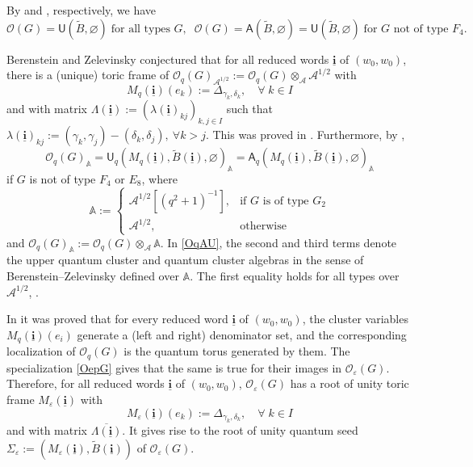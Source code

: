 \documentclass[11pt]{amsart}
\theoremstyle{plain}
\def \cA {\mathcal{A}}
\def \cAt {{\mathcal{A}}^{1/2}}
\def \A {{\boldsymbol{\mathsf A}}}
\def \U {{\boldsymbol{\mathsf U}}}
\def \B  {{\widetilde{B}}}
\def \OO {{\mathcal{O}}}
\def \ep {\varepsilon}
\def \ol {\overline}
\newcommand{\ubi}{\underline{\mathbf{i}}}
\begin{document}
By \cite[Theorem B.1]{QY} and \cite[Theorem 3.1]{O}, respectively, we have 
\begin{equation}
\label{OG}
\OO(G) = \U(\B, \varnothing) \; \mbox{for all types $G$}, \; \;    
\OO(G) = \A(\B, \varnothing) = \U(\B, \varnothing)  \; \mbox{for $G$ not of type $F_4$}.
\end{equation} 

Berenstein and Zelevinsky \cite{BerZe} conjectured that for all reduced words $\ubi$ of $(w_0, w_0)$, there is a (unique) toric frame of $\OO_q(G)_{\cAt} := \OO_q(G) \otimes_{\cA} \cAt$ 
with
\[
M_q(\ubi)(e_k):= \Delta_{\gamma_k, \delta_k}, \quad \forall \; k \in I 
\]
and with matrix $\Lambda(\ubi):= (\lambda(\ubi)_{kj})_{k,j \in I}$ such that $\lambda(\ubi)_{kj}:=(\gamma_k,\gamma_j)-(\delta_k,\delta_j),\ \forall k>j$. 
This was proved in \cite{GY1,QY}. Furthermore, by \cite[Theorem A]{OQY26}, 
\begin{equation}
\label{OqAU}
\OO_q(G)_{\mathbb{A}} = \U_q(M_q(\ubi), \B(\ubi), \varnothing)_{\mathbb{A}} =  \A_q(M_q(\ubi), \B(\ubi), \varnothing)_{\mathbb{A}}
\end{equation}
if $G$ is not of type $F_4$ or $E_8$, where  
\[
{\mathbb{A}} := 
\begin{cases}
\cAt[(q^2 +1)^{-1}], &\mbox{if $G$ is of type $G_2$}
\\
\cAt, & \mbox{otherwise}
\end{cases}
\]
and  $\OO_q(G)_{\mathbb{A}} := \OO_q(G) \otimes_{\cA} {\mathbb{A}}$. 
In \eqref{OqAU}, the second and third terms denote the upper quantum cluster and quantum cluster algebras in the sense of Berenstein--Zelevinsky 
\cite{BerZe} defined over ${\mathbb{A}}$. The first equality holds for all types over $\cAt$, \cite[Theorem A]{OQY26}. 

In \cite{GY1,QY} it was proved that for every reduced word $\ubi$ of $(w_0,w_0)$, 
the cluster variables $M_q(\ubi)(e_i)$ generate a (left and right) denominator set, and the corresponding localization 
of $\OO_q(G)$ is the quantum torus generated by them. The specialization \eqref{OepG} gives that the same is true for their images in $\OO_\ep(G)$. 
Therefore, for all reduced words $\ubi$ of $(w_0, w_0)$, $\OO_\ep(G)$ has a root of unity toric frame $M_\ep(\ubi)$ 
with 
\[
M_\ep(\ubi)(e_k):= \Delta_{\gamma_k, \delta_k}, \quad \forall \; k \in I 
\]
and with matrix $\ol{\Lambda(\ubi)}$. It gives rise to the root of unity quantum seed $\Sigma_\ep:=(M_\ep(\ubi), \B(\ubi))$ of $\OO_\ep(G)$. 
\end{document}
